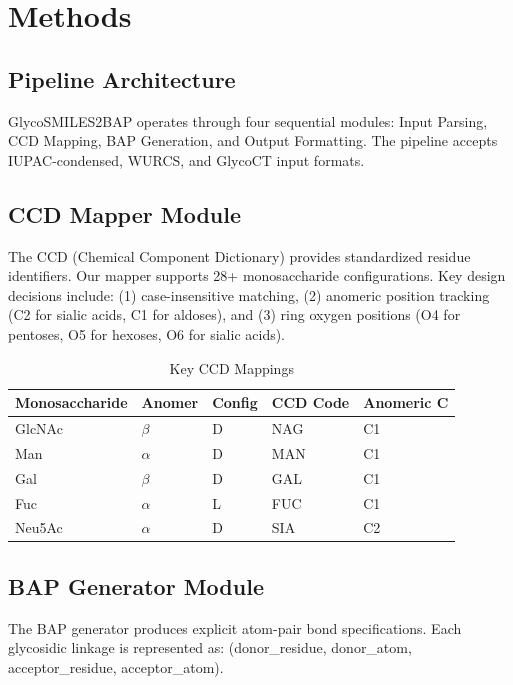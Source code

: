 \documentclass[11pt,a4paper]{article}
\begin{document}
\section{Methods}

\subsection{Pipeline Architecture}

GlycoSMILES2BAP operates through four sequential modules: Input Parsing, CCD Mapping, BAP Generation, and Output Formatting. The pipeline accepts IUPAC-condensed, WURCS, and GlycoCT input formats.

\subsection{CCD Mapper Module}

The CCD (Chemical Component Dictionary) provides standardized residue identifiers. Our mapper supports 28+ monosaccharide configurations. Key design decisions include: (1) case-insensitive matching, (2) anomeric position tracking (C2 for sialic acids, C1 for aldoses), and (3) ring oxygen positions (O4 for pentoses, O5 for hexoses, O6 for sialic acids).

\begin{table}[h]
\centering
\caption{Key CCD Mappings}
\begin{tabular}{lllll}
\toprule
Monosaccharide & Anomer & Config & CCD Code & Anomeric C \\
\midrule
GlcNAc & $\beta$ & D & NAG & C1 \\
Man & $\alpha$ & D & MAN & C1 \\
Gal & $\beta$ & D & GAL & C1 \\
Fuc & $\alpha$ & L & FUC & C1 \\
Neu5Ac & $\alpha$ & D & SIA & C2 \\
\bottomrule
\end{tabular}
\label{tab:ccd}
\end{table}

\subsection{BAP Generator Module}

The BAP generator produces explicit atom-pair bond specifications. Each glycosidic linkage is represented as: (donor\_residue, donor\_atom, acceptor\_residue, acceptor\_atom).
\end{document}

